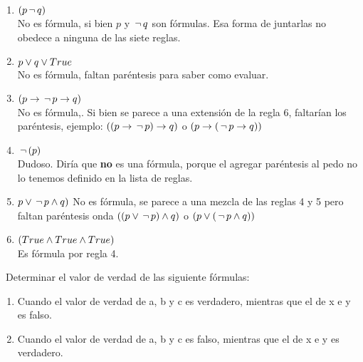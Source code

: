 \documentclass[12pt,a4paper,spanish]{article}
\begin{document}
\begin{enumerate}[label=\alph*)]
	\item $(p \,\lnot\, q)$\\
	      No es fórmula, si bien $p$ y $\,\lnot\, q$ son fórmulas. Esa forma de juntarlas no obedece a ninguna de las siete reglas.

	\item  $p \lor q \lor True$\\
	      No es fórmula, faltan paréntesis para saber como evaluar.

	\item $(p \rightarrow \,\lnot\, p \rightarrow q)$\\
	      No es fórmula,. Si bien se parece a una extensión de la regla 6, faltarían los paréntesis, ejemplo: $( (p \rightarrow \,\lnot\, p) \rightarrow q)$ o $( p \rightarrow (\,\lnot\, p \rightarrow q))$

	\item $\,\lnot\, (p)$\\
	      Dudoso. Diría que \textbf{no} es una fórmula, porque el agregar paréntesis al pedo no lo tenemos definido en la lista de reglas.

	\item $p \lor \,\lnot\, p \land q)$
	      No es fórmula, se parece a una mezcla de las reglas 4 y 5 pero faltan paréntesis onda $((p \lor \,\lnot\, p) \land q)$ o  $(p \lor (\,\lnot\, p \land q))$\\

	\item $(True \land True \land True)$\\
	      Es fórmula por regla 4.
\end{enumerate}

\ejercicio\FiveStar\ 
Determinar el valor de verdad de las siguiente fórmulas:

\begin{enumerate}[label=\arabic*. ]
	\item Cuando el valor de verdad de a, b y c es verdadero, mientras que el de x e y es falso.
	\item Cuando el valor de verdad de a, b y c es falso, mientras que el de x e y es verdadero.
\end{enumerate}
\end{document}
